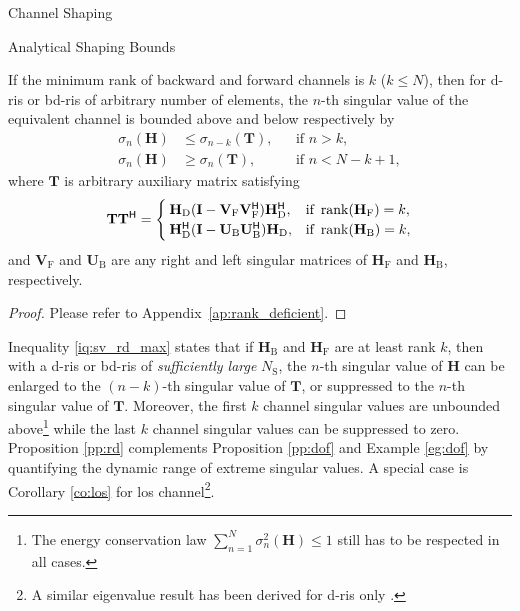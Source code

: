 \documentclass[journal]{IEEEtran}
\begin{document}
\begin{section}{Channel Shaping}
\begin{subsection}{Analytical Shaping Bounds}
		\begin{proposition}
			\label{pp:rd}
			If the minimum rank of backward and forward channels is $k$ ($k \le N$),
			then for \gls{d}-\gls{ris} or \gls{bd}-\gls{ris} of arbitrary number of elements, the $n$-th singular value of the equivalent channel is bounded above and below respectively by
			\begin{subequations}
				\label{iq:sv_rd}
				\begin{align}
					\sigma_n(\mathbf{H}) & \le \sigma_{n-k}(\mathbf{T}), &  & \text{if } n > k, \label{iq:sv_rd_max}          \\
					\sigma_n(\mathbf{H}) & \ge \sigma_n(\mathbf{T}),     &  & \text{if } n < N - k + 1, \label{iq:sv_rd_min}
				\end{align}
			\end{subequations}
			where $\mathbf{T}$ is arbitrary auxiliary matrix satisfying
			\begin{equation}
				\label{eq:auxiliary_rd}
				\mathbf{T} \mathbf{T}^\mathsf{H} =
				\begin{cases}
					\mathbf{H}_\mathrm{D} (\mathbf{I} - \mathbf{V}_\mathrm{F} \mathbf{V}_\mathrm{F}^\mathsf{H}) \mathbf{H}_\mathrm{D}^\mathsf{H}, & \text{if } \operatorname{rank}(\mathbf{H}_\mathrm{F}) = k, \\
					\mathbf{H}_\mathrm{D}^\mathsf{H} (\mathbf{I} - \mathbf{U}_\mathrm{B} \mathbf{U}_\mathrm{B}^\mathsf{H}) \mathbf{H}_\mathrm{D}, & \text{if } \operatorname{rank}(\mathbf{H}_\mathrm{B}) = k,
				\end{cases}
			\end{equation}
			and $\mathbf{V}_\mathrm{F}$ and $\mathbf{U}_\mathrm{B}$ are any right and left singular matrices of $\mathbf{H}_\mathrm{F}$ and $\mathbf{H}_\mathrm{B}$, respectively.
		\end{proposition}
		\begin{proof}
			Please refer to Appendix~\ref{ap:rank_deficient}.
		\end{proof}

		Inequality \eqref{iq:sv_rd_max} states that
		if $\mathbf{H}_\mathrm{B}$ and $\mathbf{H}_\mathrm{F}$ are at least rank $k$, then
		with a \gls{d}-\gls{ris} or \gls{bd}-\gls{ris} of \emph{sufficiently large} $N_\mathrm{S}$,
		the $n$-th singular value of $\mathbf{H}$ can be enlarged to the $(n-k)$-th singular value of $\mathbf{T}$, or suppressed to the $n$-th singular value of $\mathbf{T}$.
		Moreover, the first $k$ channel singular values are unbounded above\footnote{The energy conservation law $\sum_{n=1}^N \sigma_n^2(\mathbf{H}) \le 1$ still has to be respected in all cases.} while the last $k$ channel singular values can be suppressed to zero.
		Proposition \ref{pp:rd} complements Proposition \ref{pp:dof} and Example \ref{eg:dof} by quantifying the dynamic range of extreme singular values.
		A special case is Corollary \ref{co:los} for \gls{los} channel\footnote{A similar eigenvalue result has been derived for \gls{d}-\gls{ris} only \cite{Semmler2023}.}.



\end{subsection}
\end{section}
\end{document}
